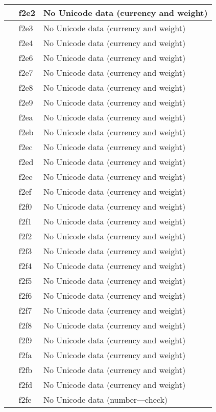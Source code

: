 \documentclass[12pt,letterpaper,openany]{book}
\begin{document}
\begin{center}
\begin{supertabular}{|m{0.25in}|m{0.5in}|m{4in}|}
 & f2e2 & No Unicode data (currency and weight)\\\hline
 & f2e3 & No Unicode data (currency and weight)\\\hline
 & f2e4 & No Unicode data (currency and weight)\\\hline
 & f2e6 & No Unicode data (currency and weight)\\\hline
 & f2e7 & No Unicode data (currency and weight)\\\hline
 & f2e8 & No Unicode data (currency and weight)\\\hline
 & f2e9 & No Unicode data (currency and weight)\\\hline
 & f2ea & No Unicode data (currency and weight)\\\hline
 & f2eb & No Unicode data (currency and weight)\\\hline
 & f2ec & No Unicode data (currency and weight)\\\hline
 & f2ed & No Unicode data (currency and weight)\\\hline
 & f2ee & No Unicode data (currency and weight)\\\hline
 & f2ef & No Unicode data (currency and weight)\\\hline
 & f2f0 & No Unicode data (currency and weight)\\\hline
 & f2f1 & No Unicode data (currency and weight)\\\hline
 & f2f2 & No Unicode data (currency and weight)\\\hline
 & f2f3 & No Unicode data (currency and weight)\\\hline
 & f2f4 & No Unicode data (currency and weight)\\\hline
 & f2f5 & No Unicode data (currency and weight)\\\hline
 & f2f6 & No Unicode data (currency and weight)\\\hline
 & f2f7 & No Unicode data (currency and weight)\\\hline
 & f2f8 & No Unicode data (currency and weight)\\\hline
 & f2f9 & No Unicode data (currency and weight)\\\hline
 & f2fa & No Unicode data (currency and weight)\\\hline
 & f2fb & No Unicode data (currency and weight)\\\hline
 & f2fd & No Unicode data (currency and weight)\\\hline
 & f2fe & No Unicode data (number---check)\\\hline

\end{supertabular}
\end{center}
\end{document}
